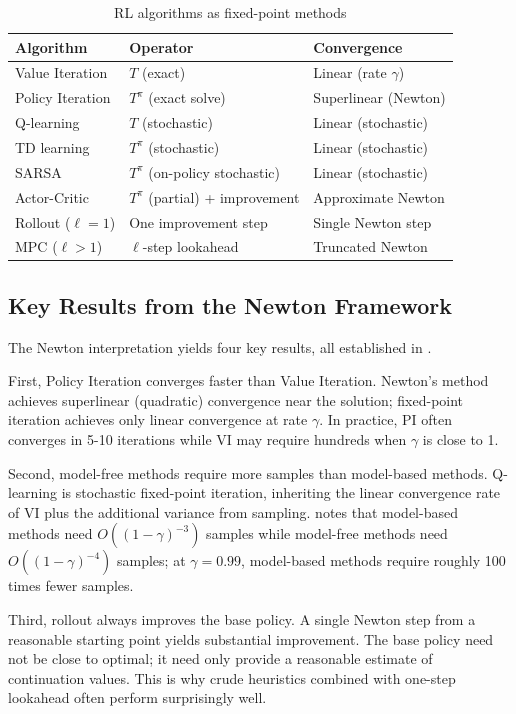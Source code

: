 \begin{table}[h!]
\centering
\caption{RL algorithms as fixed-point methods \citep{bertsekas2024}}
\label{tab:newton_correspondence}
\begin{tabular}{lll}
\hline
Algorithm & Operator & Convergence \\
\hline
Value Iteration & $T$ (exact) & Linear (rate $\gamma$) \\
Policy Iteration & $T^\pi$ (exact solve) & Superlinear (Newton) \\
Q-learning & $T$ (stochastic) & Linear (stochastic) \\
TD learning & $T^\pi$ (stochastic) & Linear (stochastic) \\
SARSA & $T^\pi$ (on-policy stochastic) & Linear (stochastic) \\
Actor-Critic & $T^\pi$ (partial) + improvement & Approximate Newton \\
Rollout ($\ell=1$) & One improvement step & Single Newton step \\
MPC ($\ell > 1$) & $\ell$-step lookahead & Truncated Newton \\
\hline
\end{tabular}
\end{table}


\subsection{Key Results from the Newton Framework}
\label{sec:why_matters}

The Newton interpretation yields four key results, all established in \citet{bertsekas2024}.

First, Policy Iteration converges faster than Value Iteration. Newton's method achieves superlinear (quadratic) convergence near the solution; fixed-point iteration achieves only linear convergence at rate $\gamma$. In practice, PI often converges in 5-10 iterations while VI may require hundreds when $\gamma$ is close to 1.

Second, model-free methods require more samples than model-based methods. Q-learning is stochastic fixed-point iteration, inheriting the linear convergence rate of VI plus the additional variance from sampling. \citet{bertsekas2024} notes that model-based methods need $O((1-\gamma)^{-3})$ samples while model-free methods need $O((1-\gamma)^{-4})$ samples; at $\gamma = 0.99$, model-based methods require roughly 100 times fewer samples.

Third, rollout always improves the base policy. A single Newton step from a reasonable starting point yields substantial improvement. The base policy need not be close to optimal; it need only provide a reasonable estimate of continuation values. This is why crude heuristics combined with one-step lookahead often perform surprisingly well.

